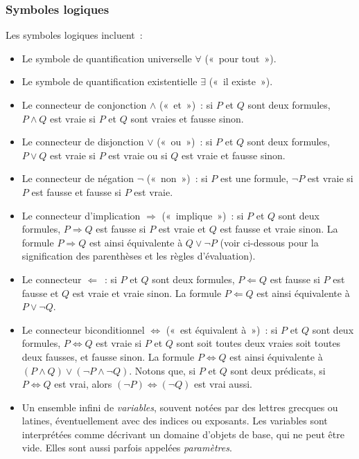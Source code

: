 \subsubsection{Symboles logiques}

Les symboles logiques incluent : 
\begin{itemize}
    \item Le symbole de quantification universelle $\forall$ (« pour tout »).
    \item Le symbole de quantification existentielle $\exists$ (« il existe »).
    \item Le connecteur de conjonction $\wedge$ (« et ») : si $P$ et $Q$ sont deux formules, $P \wedge Q$ est vraie si $P$ et $Q$ sont vraies et fausse sinon. 
    \item Le connecteur de disjonction $\vee$ (« ou ») : si $P$ et $Q$ sont deux formules, $P \vee Q$ est vraie si $P$ est vraie ou si $Q$ est vraie et fausse sinon. 
    \item Le connecteur de négation $\neg$ (« non ») : si $P$ est une formule, $\neg P$ est vraie si $P$ est fausse et fausse si $P$ est vraie. 
    \item Le connecteur d'implication $\Rightarrow$ (« implique ») : si $P$ et $Q$ sont deux formules, $P \Rightarrow Q$ est fausse si $P$ est vraie et $Q$ est fausse et vraie sinon. 
    La formule $P \Rightarrow Q$ est ainsi équivalente à $Q \vee \neg P$ (voir ci-dessous pour la signification des parenthèses et les règles d'évaluation).
    \item Le connecteur $\Leftarrow$ : si $P$ et $Q$ sont deux formules, $P \Leftarrow Q$ est fausse si $P$ est fausse et $Q$ est vraie et vraie sinon. 
    La formule $P \Leftarrow Q$ est ainsi équivalente à $P \vee \neg Q$.
    \item Le connecteur biconditionnel $\Leftrightarrow$ (« est équivalent à ») : si $P$ et $Q$ sont deux formules, $P \Leftrightarrow Q$ est vraie si $P$ et $Q$ sont soit toutes deux vraies soit toutes deux fausses, et fausse sinon. 
    La formule $P \Leftrightarrow Q$ est ainsi équivalente à $(P \wedge Q) \vee (\neg P \wedge \neg Q)$.
        Notons que, si $P$ et $Q$ sont deux prédicats, si $P \Leftrightarrow Q$ est vrai, alors $(\neg P) \Leftrightarrow (\neg Q)$ est vrai aussi.
    \item Un ensemble infini de \textit{variables}, souvent notées par des lettres grecques ou latines, éventuellement avec des indices ou exposants. 
    Les variables sont interprétées comme décrivant un domaine d'objets de base, qui ne peut être vide. 
    Elles sont aussi parfois appelées \textit{paramètres}. 
\end{itemize}

